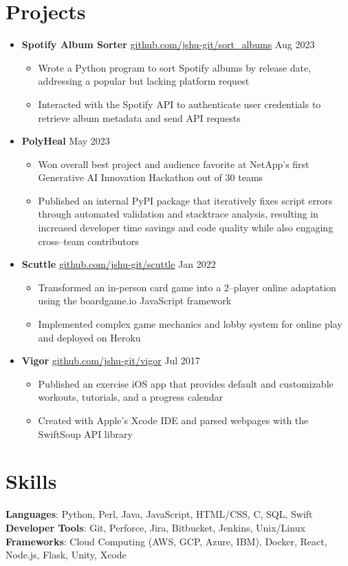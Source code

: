 \documentclass[letterpaper,11pt]{article}
\newcommand{\sectionStart}{\begin{itemize}[leftmargin=0in, label={}]}
\newcommand{\sectionEnd}{\end{itemize}\vspace{-8pt}}
\newcommand{\singleHeading}[2]{
  \item
    #1 \hspace*{\fill} #2 \\
    \vspace{-6pt}
}
\newcommand{\itemListStart}{\begin{itemize}}
\newcommand{\itemListEnd}{\end{itemize}\vspace{-12pt}}
\newcommand{\resumeItem}[1]{
  \item
    \small #1
    \vspace{-3pt} %
}
\begin{document}
  \section{Projects}
    \sectionStart
      \singleHeading{\textbf{Spotify Album Sorter} \href{https://github.com/jshu-git/sort_albums}{github.com/jshu-git/sort\_albums}}{Aug 2023}
        \itemListStart
          \resumeItem{Wrote a Python program to sort Spotify albums by release date, addressing a popular but lacking platform request}
          \resumeItem{Interacted with the Spotify API to authenticate user credentials to retrieve album metadata and send API requests}
        \itemListEnd
      \singleHeading{\textbf{PolyHeal}}{May 2023}
        \itemListStart
          \resumeItem{Won overall best project and audience favorite at NetApp's first Generative AI Innovation Hackathon out of 30 teams}
          \resumeItem{Published an internal PyPI package that iteratively fixes script errors through automated validation and stacktrace analysis, resulting in increased developer time savings and code quality while also engaging cross--team contributors}
        \itemListEnd
      \singleHeading{\textbf{Scuttle} \href{https://github.com/jshu-git/scuttle}{github.com/jshu-git/scuttle}}{Jan 2022}
        \itemListStart
          \resumeItem{Transformed an in-person card game into a 2--player online adaptation using the boardgame.io JavaScript framework}
          \resumeItem{Implemented complex game mechanics and lobby system for online play and deployed on Heroku}
        \itemListEnd
      \singleHeading{\textbf{Vigor} \href{https://github.com/jshu-git/vigor}{github.com/jshu-git/vigor}}{Jul 2017}
        \itemListStart
          \resumeItem{Published an exercise iOS app that provides default and customizable workouts, tutorials, and a progress calendar}
          \resumeItem{Created with Apple's Xcode IDE and parsed webpages with the SwiftSoup API library}
        \itemListEnd
    \sectionEnd

  \section{Skills}
    \sectionStart
      \small{
        \item{
          \textbf{Languages}{: Python, Perl, Java, JavaScript, HTML/CSS, C, SQL, Swift} \\
          \textbf{Developer Tools}{: Git, Perforce, Jira, Bitbucket, Jenkins, Unix/Linux} \\
          \textbf{Frameworks}{: Cloud Computing (AWS, GCP, Azure, IBM), Docker, React, Node.js, Flask, Unity, Xcode} \\
        }
      }
    \sectionEnd
    \vspace{-6pt} %
\end{document}
